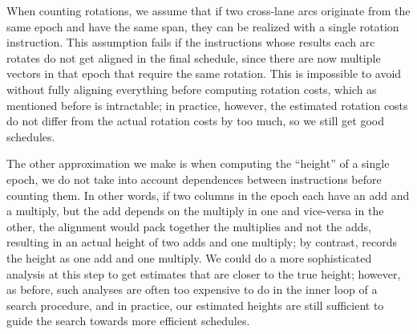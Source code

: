 When counting rotations, we assume that if two cross-lane arcs originate from the same epoch and have the same span, they can be realized with a single rotation instruction.
This assumption fails if the instructions whose results each arc rotates do not get aligned in the final schedule, since there are now multiple vectors in that epoch that require the same rotation.
This is impossible to avoid without fully aligning everything before computing rotation costs, which as mentioned before is intractable; in practice, however, the estimated rotation costs do not differ from the actual rotation costs by too much, so we still get good schedules. %

The other approximation we make is when computing the ``height'' of a single epoch, we do not take into account dependences between instructions before counting them. 
In other words, if two columns in the epoch each have an add and a multiply, but the add depends on the multiply in one and vice-versa in the other, the alignment would pack together the multiplies and not the adds, resulting in an actual height of two adds and one multiply; by contrast, \system records the height as one add and one multiply.
We could do a more sophisticated analysis at this step to get estimates that are closer to the true height; however, as before, such analyses are often too expensive to do in the inner loop of a search procedure, and in practice, our estimated heights are still sufficient to guide the search towards more efficient schedules.



